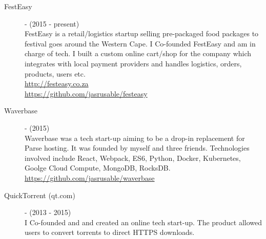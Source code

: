 \documentclass[margin,line,a4paper]{resume}
\begin{document}
\begin{resume}
	        \begin{description}
	        	\item [FestEasy] - (2015 - present) \\
	        	FestEasy is a retail/logistics startup selling pre-packaged food packages to festival goes around the Western Cape.
	        	I Co-founded FestEasy and am in charge of tech. I built a custom online cart/shop for the company which integrates with local payment providers and handles logistics, orders, products, users etc. \\
	        	\href{http://festeasy.co.za}{http://festeasy.co.za} \\
	        	\href{https://github.com/jasrusable/festeasy}{https://github.com/jasrusable/festeasy} \\
	        	
	        \end{description}
            
            \begin{description}
            	\item [Waverbase] - (2015) \\
            	Waverbase was a tech start-up aiming to be a drop-in replacement for Parse hosting.
            	It was founded by myself and three friends.
            	Technologies involved include React, Webpack, ES6, Python, Docker, Kubernetes, Goolge Cloud Compute, MongoDB, RocksDB.\\
            	\href{https://github.com/jasrusable/waverbase}{https://github.com/jasrusable/waverbase}\\
            \end{description}
            
            \begin{description}
            	\item [QuickTorrent (qt.com)] - (2013 - 2015) \\
            	I Co-founded and and created an online tech start-up.
            	The product allowed users to convert torrents to direct HTTPS downloads.
            \end{description}


\end{resume}
\end{document}
